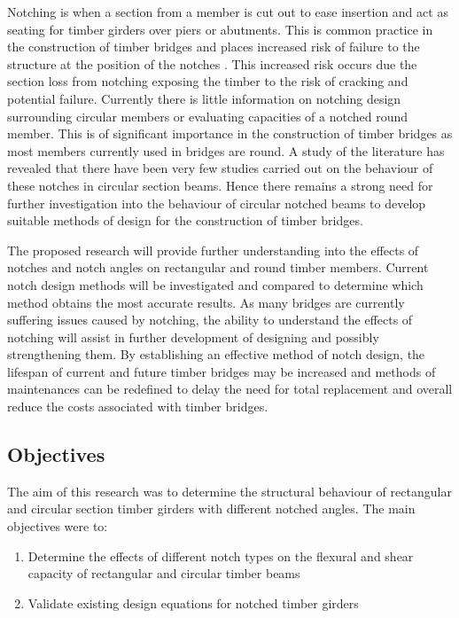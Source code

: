 \documentclass[11pt,a4paper]{article}
\numberwithin{equation}{subsection}
\begin{document}
	\vspace*{\baselineskip}
	
	\noindent
     Notching is when a section from a member is cut out to ease insertion and act as seating for timber girders over piers or abutments. This is common practice in the construction of timber bridges and places increased risk of failure to the structure at the position of the notches \cite{_timber_2005}. This increased risk occurs due the section loss from notching exposing the timber to the risk of cracking and potential failure. Currently there is little information on notching design surrounding circular members or evaluating capacities of a notched round member. This is of significant importance in the construction of timber bridges as most members currently used in bridges are round. A study of the literature has revealed that there have been very few studies carried out on the behaviour of these notches in circular section beams. Hence there remains a strong need for further investigation into the behaviour of circular notched beams to develop suitable methods of design for the construction of timber bridges. 
	
	\vspace*{\baselineskip}
	
	\noindent
    The proposed research will provide further understanding into the effects of notches and notch angles on rectangular and round timber members. Current notch design methods will be investigated and compared to determine which method obtains the most accurate results. As many bridges are currently suffering issues caused by notching, the ability to understand the effects of notching will assist in further development of  designing and possibly strengthening them. By establishing an effective method of notch design, the lifespan of current and future timber bridges may be increased and methods of maintenances can be redefined to delay the need for total replacement and overall reduce the costs associated with timber bridges.  
	
	\subsection{Objectives}
	The aim of this research was to determine the structural behaviour of rectangular and circular section timber girders with different notched angles. The main objectives were to:\par 
	
	\begin{enumerate}
		\item Determine the effects of different notch types on the flexural and shear capacity of rectangular and circular timber beams
		\item Validate existing design equations for notched timber girders
	\end{enumerate}
	
\end{document}
